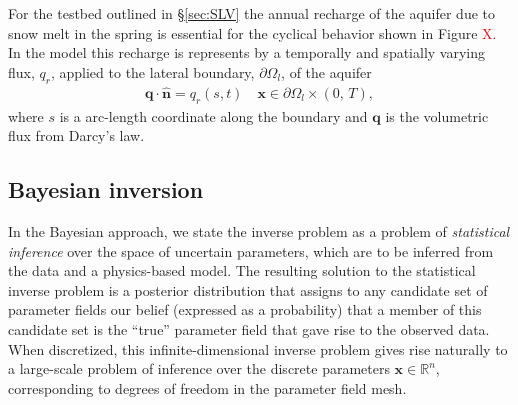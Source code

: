 \documentclass[11pt,final]{article}%
\newcommand{\note}[1]{\textcolor{red}{ #1}}
\renewcommand{\vec}[1] {\ensuremath{\boldsymbol{#1}}}
\begin{document}
For the testbed outlined in \S\ref{sec:SLV} the annual recharge of the aquifer due to snow melt in the spring is essential for the cyclical behavior shown in Figure \note{X}. In the model this recharge is represents by a temporally and spatially varying flux, $q_r$, applied to the lateral boundary, $\partial\Omega_l$, of the aquifer
\begin{align}
    \mathbf{q}\cdot\hat{\mathbf{n}} = q_r(s,t)\quad \mathbf{x} \in \partial\Omega_l \times (0,\,T),
\end{align}
where $s$ is a arc-length coordinate along the boundary and $\mathbf{q}$ is the volumetric flux from Darcy's law.



\subsection{Bayesian inversion}\label{sec:bayesian}

In the Bayesian approach, we state the inverse problem as a problem of
\emph{statistical inference} over the space of uncertain parameters,
which are to be inferred from the data and a physics-based model.
The resulting solution to the statistical inverse problem is a
posterior distribution that assigns to any candidate set of parameter
fields our belief (expressed as a probability) that a member of this
candidate set is the ``true'' parameter field that gave rise to the
observed data.
%
When discretized, this  infinite-dimensional inverse problem  gives
rise naturally to a large-scale problem of inference over the discrete
parameters
$\vec{x} \in \mathbb R^n$, corresponding to degrees of
freedom in the parameter field mesh.
\end{document}
